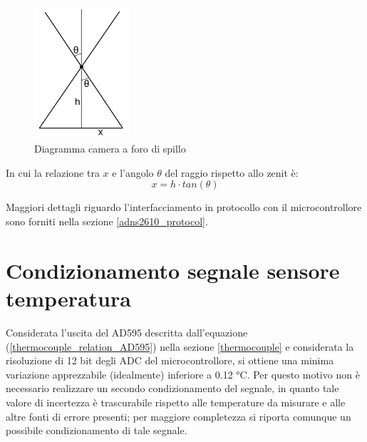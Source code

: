 \documentclass[12pt]{article}
\begin{document}
    \begin{figure}[h]
        \centering
        \includegraphics[width=100pt]{Draws/Pinhole_diagram}
        \caption{Diagramma camera a foro di spillo}
        \label{fig:pinhole_diagram}
    \end{figure}
    
    \noindent
    In cui la relazione tra $x$ e l'angolo $\theta$ del raggio rispetto allo zenit è:
    \begin{equation}\label{pinhole_angle_relation}
        x = h \cdot tan(\theta)
    \end{equation}
    
    \noindent
    Maggiori dettagli riguardo l'interfacciamento in protocollo con il microcontrollore sono forniti nella sezione \ref{adns2610_protocol}.
    
    
 
\section{Condizionamento segnale sensore temperatura}\label{conditioning}
    Considerata l'uscita del AD595 descritta dall'equazione (\ref{thermocouple_relation_AD595}) nella sezione \ref{thermocouple} e considerata la risoluzione di 12 bit degli ADC del microcontrollore, si ottiene una minima variazione apprezzabile (idealmente) inferiore a 0.12 °C. Per questo motivo non è necessario realizzare un secondo condizionamento del segnale, in quanto tale valore di incertezza è trascurabile rispetto alle temperature da misurare e alle altre fonti di errore presenti; per maggiore completezza si riporta comunque un possibile condizionamento di tale segnale. \\
    
    \vspace{0.2cm}
    
\end{document}

